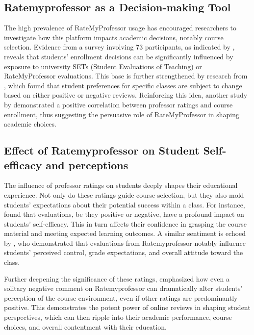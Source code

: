 \documentclass[man, 12pt]{apa7}
\begin{document}
\subsection{Ratemyprofessor as a Decision-making Tool}
The high prevalence of RateMyProfessor usage has encouraged researchers to investigate how this platform impacts academic decisions, notably course selection. Evidence from a survey involving 73 participants, as indicated by \textcite{boswell_effects_2020}, reveals that students' enrollment decisions can be significantly influenced by exposure to university SETs (Student Evaluations of Teaching) or RateMyProfessor evaluations. This base is further strengthened by research from \textcite{orlova_ratemyprofessorscom_2021}, which found that student preferences for specific classes are subject to change based on either positive or negative reviews. Reinforcing this idea, another study by \textcite{johnson_i_2014} demonstrated a positive correlation between professor ratings and course enrollment, thus suggesting the persuasive role of RateMyProfessor in shaping academic choices.

\subsection{Effect of Ratemyprofessor on Student Self-efficacy and perceptions}
The influence of professor ratings on students deeply shapes their educational experience. Not only do these ratings guide course selection, but they also mold students' expectations about their potential success within a class. For instance, \textcite{boswell_effects_2020} found that evaluations, be they positive or negative, have a profound impact on students' self-efficacy. This in turn affects their confidence in grasping the course material and meeting expected learning outcomes. A similar sentiment is echoed by \textcite{kowai-bell_rate_2011}, who demonstrated that evaluations from Ratemyprofessor notably influence students' perceived control, grade expectations, and overall attitude toward the class.

Further deepening the significance of these ratings, \textcite{scherr_single_2013} emphasized how even a solitary negative comment on Ratemyprofessor can dramatically alter students' perception of the course environment, even if other ratings are predominantly positive. This demonstrates the potent power of online reviews in shaping student perspectives, which can then ripple into their academic performance, course choices, and overall contentment with their education.
\end{document}
